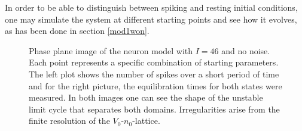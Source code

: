 \documentclass[12pt,a4paper]{article}
\begin{document}
In order to be able to distinguish between spiking and resting initial conditions, one may simulate the system at different starting points and see how it evolves, as has been done in section \ref{mod1won}.
\begin{figure}[H]
	\hspace*{-0.5cm}
	
	\caption{Phase plane image of the neuron model with $I=46$ and no noise. Each point represents a specific combination of starting parameters. The left plot shows the number of spikes over a short period of time and for the right picture, the equilibration times for both states were measured. In both images one can see the shape of the unstable limit cycle that separates both domains. Irregularities arise from the finite resolution of the $V_0$-$n_0$-lattice.}
	\label{twodom2}
\end{figure}
\end{document}
